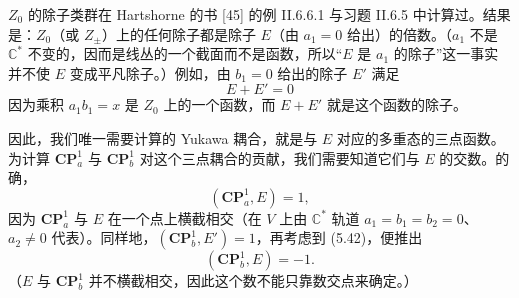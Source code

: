 $Z_{0}$ 的除子类群在 Hartshorne 的书 [45] 的例 II.6.6.1 与习题 II.6.5 中计算过。结果是：$Z_{0}$（或 $Z_{\pm}$）上的任何除子都是除子 $E$（由 $a_{1}=0$ 给出）的倍数。（$a_{1}$ 不是 $\mathbb{C}^{*}$ 不变的，因而是线丛的一个截面而不是函数，所以“$E$ 是 $a_{1}$ 的除子”这一事实并不使 $E$ 变成平凡除子。）例如，由 $b_{1}=0$ 给出的除子 $E'$ 满足
\begin{equation}
\tag{5.42}
E+E'=0
\end{equation}
因为乘积 $a_{1}b_{1}=x$ 是 $Z_{0}$ 上的一个函数，而 $E+E'$ 就是这个函数的除子。


因此，我们唯一需要计算的 Yukawa 耦合，就是与 $E$ 对应的多重态的三点函数。为计算 $\mathbf{CP}^{1}_{a}$ 与 $\mathbf{CP}^{1}_{b}$ 对这个三点耦合的贡献，我们需要知道它们与 $E$ 的交数。的确，
\begin{equation}
\tag{5.43}
(\mathbf{CP}^{1}_{a},E)=1,
\end{equation}
因为 $\mathbf{CP}^{1}_{a}$ 与 $E$ 在一个点上横截相交（在 $V$ 上由 $\mathbb{C}^{*}$ 轨道 $a_{1}=b_{1}=b_{2}=0$、$a_{2}\neq0$ 代表）。同样地，$(\mathbf{CP}^{1}_{b},E')=1$，再考虑到 (5.42)，便推出
\begin{equation}
\tag{5.44}
(\mathbf{CP}^{1}_{b},E)=-1.
\end{equation}
（$E$ 与 $\mathbf{CP}^{1}_{b}$ 并不横截相交，因此这个数不能只靠数交点来确定。）


\label{op:73}

